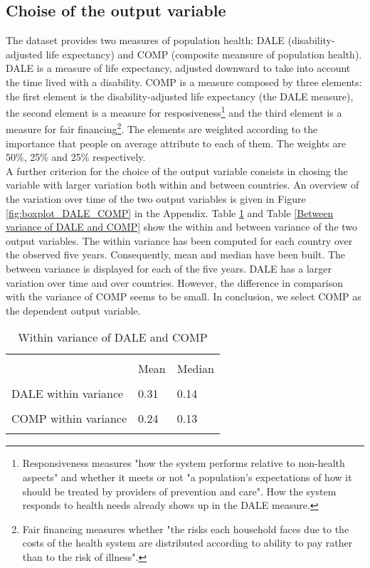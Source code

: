 \documentclass[12pt,a4paper]{article}\usepackage[]{graphicx}\usepackage[]{color}
\begin{document}
\subsection{Choise of the output variable}
The dataset provides two measures of population health: DALE (disability-adjusted life expectancy) and COMP (composite meansure of population health). DALE is a measure of life expectancy, adjusted downward to take into account the time lived with a disability. COMP is a measure composed by three elements: the first element is the disability-adjusted life expectancy (the DALE measure), the second element is a measure for resposiveness\footnote{Responsiveness measures "how the system performs relative to non-health aspects" and whether it meets or not "a population's expectations of how it should be treated by providers of prevention and care". How the system responds to health needs already shows up in the DALE measure.} and the third element is a measure for fair financing\footnote{Fair financing measures whether "the risks each household faces due to the costs of the health system are distributed according to ability to pay rather than to the risk of illness".}. The elements are weighted according to the importance that people on average attribute to each of them. The weights are 50\%, 25\% and 25\% respectively. \\




A further criterion for the choice of the output variable consists in chosing the variable with larger variation both within and between countries. An overview of the variation over time of the two output variables is given in Figure \ref{fig:boxplot_DALE_COMP} in the Appendix. Table \ref{Within variance of DALE and COMP} and Table \ref{Between variance of DALE and COMP} show the within and between variance of the two output variables. The within variance has been computed for each country over the observed five years. Consequently, mean and median have been built. The between variance is displayed for each of the five years. DALE has a larger variation over time and over countries. However, the difference in comparison with the variance of COMP seems to be small. In conclusion, we select COMP as the dependent output variable.



\begin{table}[htbp] \centering 
  \caption{Within variance of DALE and COMP} 
  \label{Within variance of DALE and COMP} 
  \normalsize
\begin{tabular}{p{5cm} p{1.5cm} p{1.5cm}} 
\\[-1.8ex]\hline 
\hline \\[-1.8ex] 
 & Mean & Median \\ 
\hline \\[-1.8ex] 
DALE within variance & 0.31 & 0.14 \\
\hline \\[-1.8ex] 
COMP within variance & 0.24 & 0.13 \\
\hline
\hline \\[-1.8ex] 
\end{tabular} 
\end{table} 
\end{document}
